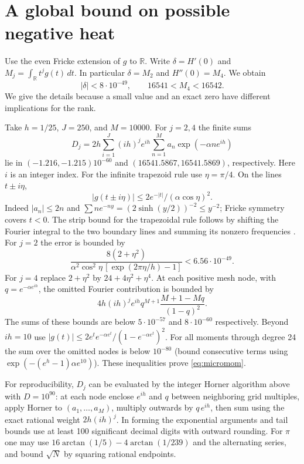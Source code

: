 \documentclass[11pt]{article}
\begin{document}
\section{A global bound on possible negative heat}

Use the even Fricke extension of $g$ to $\mathbb R$. Write
$\delta=H'(0)$ and $M_j=\int_{\mathbb R} t^jg(t)\,dt$.
In particular $\delta=M_2$ and $H''(0)=M_4$. We obtain
\begin{equation}\label{eq:micromom}
|\delta|<8\cdot10^{-49},\qquad 16541<M_4<16542.
\end{equation}
We give the details because a small value and an exact zero have
different implications for the rank.

Take $h=1/25$, $J=250$, and $M=10000$. For $j=2,4$ the finite sums
\[
D_j=2h\sum_{i=1}^J (ih)^j e^{ih}
        \sum_{n=1}^M a_n\exp(-\alpha n e^{ih})
\]
lie in $(-1.216,-1.215)10^{-60}$ and $(16541.5867,16541.5869)$,
respectively. Here $i$ is an integer index. For the infinite trapezoid
rule use $\eta=\pi/4$. On the lines $t\pm i\eta$,
\[
 |g(t\pm i\eta)|\le 2e^{-|t|}/(\alpha\cos\eta)^2.
\]
Indeed $|a_n|\le2n$ and $\sum n e^{-ny}=(2\sinh(y/2))^{-2}\le y^{-2}$;
Fricke symmetry covers $t<0$. The strip bound for the trapezoidal
rule follows by shifting the Fourier integral to the two boundary lines
and summing its nonzero frequencies \cite{TW}.
For $j=2$ the error is bounded by
\[
\frac{8(2+\eta^2)}{\alpha^2\cos^2\eta\,[\exp(2\pi\eta/h)-1]}
<6.56\cdot10^{-49}.
\]
For $j=4$ replace $2+\eta^2$ by $24+4\eta^2+\eta^4$.
At each positive mesh node, with $q=e^{-\alpha e^{ih}}$,
the omitted Fourier contribution is bounded by
\[
4h(ih)^j e^{ih}q^{M+1}
       \frac{M+1-Mq}{(1-q)^2}.
\]
The sums of these bounds are below $5\cdot10^{-57}$ and
$8\cdot10^{-60}$ respectively. Beyond $ih=10$ use
$|g(t)|\le 2e^t e^{-\alpha e^t}/(1-e^{-\alpha e^t})^2$.
For all moments through degree 24 the sum over the omitted nodes
is below $10^{-80}$ (bound consecutive terms using
$\exp(-(e^h-1)\alpha e^{10})$). These inequalities prove
\eqref{eq:micromom}.

For reproducibility, $D_j$ can be evaluated by the integer Horner
algorithm above with $D=10^{90}$: at each node enclose $e^{ih}$ and
$q$ between neighboring grid multiples, apply Horner to
$(a_1,\ldots,a_M)$, multiply outwards by $q\,e^{ih}$, then sum using
the exact rational weight $2h(ih)^j$. In forming the exponential
arguments and tail bounds use at least 100 significant decimal digits
with outward rounding. For $\pi$ one may use
$16\arctan(1/5)-4\arctan(1/239)$ and the alternating series,
and bound $\sqrt N$ by squaring rational endpoints.
\end{document}
